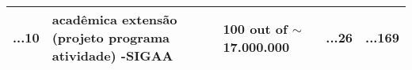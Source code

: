 \begin{table}[!htb]
\begin{tabular}{c|p{3cm}|l|p{1.5cm}|c}
    ...10                                             & acadêmica extensão (projeto \textbar{} programa \textbar{} atividade) -SIGAA                                                & 100 out of $\sim$17.000.000 & ...26                                                               & ...169            \\
    \toprule
  \end{tabular}
\end{table}